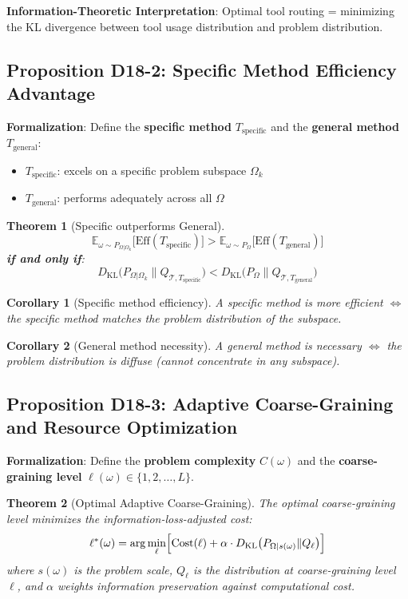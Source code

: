 \documentclass[12pt, a4paper]{article}
\newtheorem{theorem}{Theorem}[section]
\newtheorem{corollary}{Corollary}[section]
\newcommand{\E}{\mathbb{E}}
\newcommand{\KL}{D_{\mathrm{KL}}}
\newcommand{\argmin}{\arg\min}
\begin{document}
\textbf{Information-Theoretic Interpretation}: Optimal tool routing = minimizing the KL divergence between tool usage distribution and problem distribution.

\subsection{Proposition D18-2: Specific Method Efficiency Advantage}

\textbf{Formalization}: Define the \textbf{specific method} $T_{\text{specific}}$ and the \textbf{general method} $T_{\text{general}}$:
\begin{itemize}
\item $T_{\text{specific}}$: excels on a specific problem subspace $\Omega_k$
\item $T_{\text{general}}$: performs adequately across all $\Omega$
\end{itemize}

\begin{theorem}[Specific outperforms General]\label{thm:d18-2}
$$\E_{\omega \sim P_{\Omega|\Omega_k}} \bigl[\text{Eff}(T_{\text{specific}})\bigr] > \E_{\omega \sim P_{\Omega}} \bigl[\text{Eff}(T_{\text{general}})\bigr]$$
\textbf{if and only if}:
$$\KL\bigl(P_{\Omega|\Omega_k} \| Q_{\mathcal{T}, T_{\text{specific}}}\bigr) < \KL\bigl(P_{\Omega} \| Q_{\mathcal{T}, T_{\text{general}}}\bigr)$$
\end{theorem}

\begin{corollary}[Specific method efficiency]
A specific method is more efficient $\iff$ the specific method matches the problem distribution of the subspace.
\end{corollary}

\begin{corollary}[General method necessity]
A general method is necessary $\iff$ the problem distribution is diffuse (cannot concentrate in any subspace).
\end{corollary}

\subsection{Proposition D18-3: Adaptive Coarse-Graining and Resource Optimization}

\textbf{Formalization}: Define the \textbf{problem complexity} $C(\omega)$ and the \textbf{coarse-graining level} $\ell(\omega) \in \{1, 2, \ldots, L\}$.

\begin{theorem}[Optimal Adaptive Coarse-Graining]\label{thm:d18-3}
The optimal coarse-graining level minimizes the information-loss-adjusted cost:
$$\ell^*(\omega) = \argmin_{\ell} \Bigl[ \text{Cost}(\ell) + \alpha \cdot \KL\bigl(P_{\Omega|s(\omega)} \| Q_{\ell}\bigr) \Bigr]$$
where $s(\omega)$ is the problem scale, $Q_{\ell}$ is the distribution at coarse-graining level $\ell$, and $\alpha$ weights information preservation against computational cost.
\end{theorem}
\end{document}
